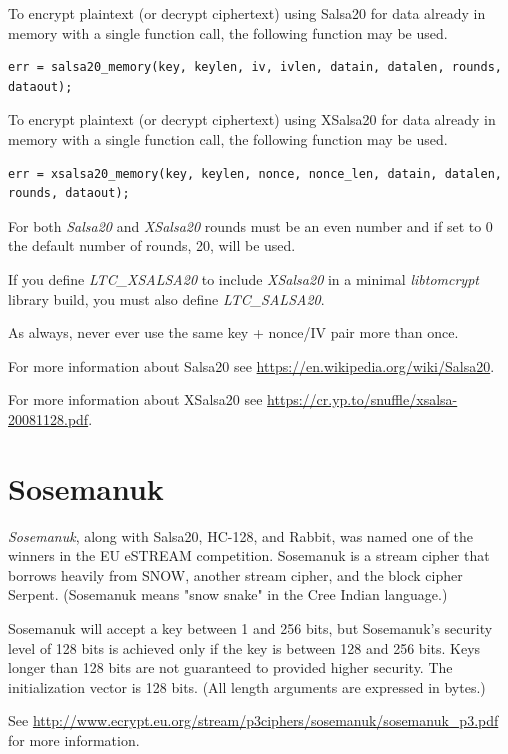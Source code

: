 \documentclass[synpaper]{book}
\newcommand{\mysection}[1]    %
	{                   %
	\section{#1}
   \markboth{\textsf{www.libtom.net}}{\thesection ~ {#1}}
	}
\begin{document}
To encrypt plaintext (or decrypt ciphertext) using Salsa20 for data already in
memory with a single function call, the following function may be used.
\begin{verbatim}
err = salsa20_memory(key, keylen, iv, ivlen, datain, datalen, rounds, dataout);
\end{verbatim}

To encrypt plaintext (or decrypt ciphertext) using XSalsa20 for data already in
memory with a single function call, the following function may be used.
\begin{verbatim}
err = xsalsa20_memory(key, keylen, nonce, nonce_len, datain, datalen, rounds, dataout);
\end{verbatim}

For both \textit{Salsa20} and \textit{XSalsa20} rounds must be an even number
and if set to 0 the default number of rounds, 20, will be used.
\vspace{1mm}

If you define \textit{LTC\_XSALSA20} to include \textit{XSalsa20} in a minimal
\textit{libtomcrypt} library build, you must also define \textit{LTC\_SALSA20}.
\vspace{1mm}

As always, never ever use the same key + nonce/IV pair more than once.
\vspace{1mm}

For more information about Salsa20 see
\url{https://en.wikipedia.org/wiki/Salsa20}.
\vspace{1mm}

For more information about XSalsa20 see
\url{https://cr.yp.to/snuffle/xsalsa-20081128.pdf}.
\vspace{1mm}

\mysection{Sosemanuk}

\textit{Sosemanuk}, along with Salsa20, HC-128, and Rabbit, was named one of the winners in
the EU eSTREAM competition.  Sosemanuk is a stream cipher that borrows heavily from SNOW,
another stream cipher, and the block cipher Serpent.  (Sosemanuk means "snow snake" in the
Cree Indian language.)

Sosemanuk will accept a key between 1 and 256 bits, but Sosemanuk's security level of 128
bits is achieved only if the key is between 128 and 256 bits.  Keys longer than 128 bits
are not guaranteed to provided higher security.  The initialization vector is 128 bits.
(All length arguments are expressed in bytes.)

See \url{http://www.ecrypt.eu.org/stream/p3ciphers/sosemanuk/sosemanuk_p3.pdf} for more
information.
\end{document}
